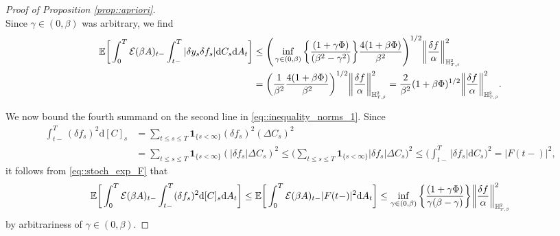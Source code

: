 \documentclass[10pt]{article} %
\newcommand\cE{\mathcal E}
\newcommand{\smalltext}[1]{\text{\fontsize{4}{4}\selectfont$#1$}}
\def \E{\mathbb{E}}
\def \H{\mathbb{H}}
\newcommand{\1}{\mathbf{1}}
\def\d{\mathrm{d}}
\begin{document}
\begin{proof}[Proof of Proposition \ref{prop::apriori}]
\begin{equation*}
\end{equation*}
Since $\gamma \in (0,\beta)$ was arbitrary, we find
\begin{align}\label{eq9}
	\E\bigg[ \int_0^T \cE(\beta A)_{t-}\int_{t-}^T |\delta y_s \delta f_s|\d C_s \d A_t \bigg] 
	&\leq \Bigg( \inf_{\gamma \in (0,\beta)}\bigg\{\frac{(1+\gamma\Phi)}{(\beta^2-\gamma^2)}\bigg\} \frac{4(1+\beta\Phi)}{\beta^2}\Bigg)^{1/2}\bigg\|\frac{\delta f}{\alpha} \bigg\|^2_{\H^\smalltext{2}_{\smalltext{T}\smalltext{,}\smalltext{\beta}}} \nonumber\\
	&= \bigg(\frac{1}{\beta^2} \frac{4(1+\beta\Phi)}{\beta^2}\bigg)^{1/2}\bigg\|\frac{\delta f}{\alpha} \bigg\|^2_{\H^\smalltext{2}_{\smalltext{T}\smalltext{,}\smalltext{\beta}}} = \frac{2}{\beta^2}(1+\beta\Phi)^{1/2}\bigg\|\frac{\delta f}{\alpha} \bigg\|^2_{\H^\smalltext{2}_{\smalltext{T}\smalltext{,}\smalltext{\beta}}}.
\end{align}

\medskip
We now bound the fourth summand on the second line in \eqref{eq::inequality_norms_1}. Since
\begin{align*}
	\int_{t-}^T(\delta f_s)^2\d[C]_s 
	&= \sum_{t \leq s \leq T}\mathbf{1}_{\{s < \infty\}}(\delta f_s)^2 (\Delta C_s)^2 \nonumber\\
	&= \sum_{t \leq s \leq T}\mathbf{1}_{\{s < \infty\}}(|\delta f_s|\Delta C_s)^2 
	\leq \bigg(\sum_{t \leq s \leq T}\mathbf{1}_{\{s < \infty\}}|\delta f_s|\Delta C_s\bigg)^2 
	\leq \bigg(\int_{t-}^T|\delta f_s|\d C_s\bigg)^2 = |F(t-)|^2,
\end{align*}
it follows from \eqref{eq::stoch_exp_F} that
\begin{equation}\label{eq10}
	\E \bigg[ \int_0^T \cE(\beta A)_{t-}\int_{t-}^T(\delta f_s)^2\d[C]_s \d A_t \bigg] 
	\leq \E \bigg[ \int_0^T \cE(\beta A)_{t-}|F(t-)|^2 \d A_t \bigg]
	\leq \inf_{\gamma \in (0,\beta)}\bigg\{\frac{(1+\gamma\Phi)}{\gamma(\beta-\gamma)}\bigg\} \bigg\|\frac{\delta f}{\alpha}\bigg\|^2_{\H^\smalltext{2}_{\smalltext{T}\smalltext{,}\smalltext{\beta}}}
\end{equation}
by arbitrariness of $\gamma \in (0,\beta)$.


\end{proof}
\end{document}

